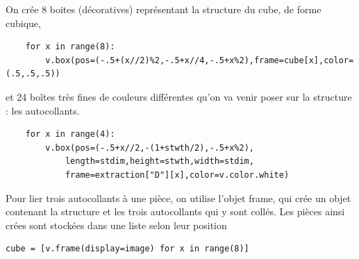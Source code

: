 \documentclass[11pt,a4paper]{article}
\begin{document}
On crée 8 boites (décoratives) représentant la structure du cube, de forme cubique,
\begin{lstlisting}
    for x in range(8):
        v.box(pos=(-.5+(x//2)%2,-.5+x//4,-.5+x%2),frame=cube[x],color=(.5,.5,.5))
\end{lstlisting}
et 24 boîtes très fines de couleurs différentes qu'on va venir poser sur la structure : les autocollants.
\begin{lstlisting}
    for x in range(4):
        v.box(pos=(-.5+x//2,-(1+stwth/2),-.5+x%2),
            length=stdim,height=stwth,width=stdim,
            frame=extraction["D"][x],color=v.color.white)
\end{lstlisting}
Pour lier trois autocollants à une pièce, on utilise l'objet frame, qui crée un objet contenant la structure
et les trois autocollants qui y sont collés. Les pièces ainsi crées sont stockées dans une liste selon leur position
\begin{lstlisting}
cube = [v.frame(display=image) for x in range(8)]
\end{lstlisting}
\end{document}
